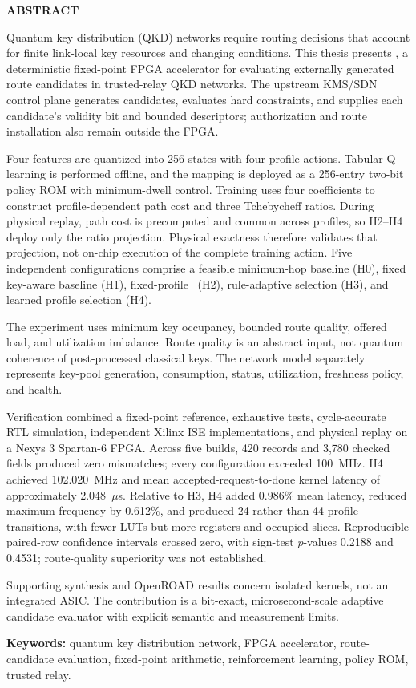 \begin{center}
  {\bfseries\fontsize{16pt}{19pt}\selectfont ABSTRACT}
\end{center}
\vspace{0.8cm}

\noindent
Quantum key distribution (QKD) networks require routing decisions that account for
finite link-local key resources and changing conditions. This thesis presents
\QFlow, a deterministic fixed-point FPGA accelerator for evaluating externally
generated route candidates in trusted-relay QKD networks. The upstream KMS/SDN
control plane generates candidates, evaluates hard constraints, and supplies each
candidate's validity bit and bounded descriptors; authorization and route
installation also remain outside the FPGA.

Four features are quantized into 256 states with four profile actions. Tabular
Q-learning is performed offline, and the mapping is deployed as a 256-entry two-bit
policy ROM with minimum-dwell control. Training uses four coefficients to construct
profile-dependent path cost and three Tchebycheff ratios. During physical replay,
path cost is precomputed and common across profiles, so H2--H4 deploy only the ratio
projection. Physical exactness therefore validates that projection, not on-chip
execution of the complete training action. Five independent configurations comprise
a feasible minimum-hop baseline (H0), fixed key-aware baseline (H1), fixed-profile
\QFlow\ (H2), rule-adaptive selection (H3), and learned profile selection (H4).

The experiment uses minimum key occupancy, bounded route quality, offered load, and
utilization imbalance. Route quality is an abstract input, not quantum coherence of
post-processed classical keys. The network model separately represents key-pool
generation, consumption, status, utilization, freshness policy, and health.

Verification combined a fixed-point reference, exhaustive tests, cycle-accurate RTL
simulation, independent Xilinx ISE implementations, and physical replay on a Nexys 3
Spartan-6 FPGA. Across five builds, 420 records and 3,780 checked fields produced zero
mismatches; every configuration exceeded 100~MHz. H4 achieved 102.020~MHz and mean
accepted-request-to-done kernel latency of approximately 2.048~$\mu$s. Relative to
H3, H4 added 0.986\% mean latency, reduced maximum frequency by 0.612\%, and produced
24 rather than 44 profile transitions, with fewer LUTs but more registers and
occupied slices. Reproducible paired-row confidence intervals crossed zero, with
sign-test $p$-values 0.2188 and 0.4531; route-quality superiority was not established.

Supporting synthesis and OpenROAD results concern isolated kernels, not an
integrated ASIC. The contribution is a bit-exact, microsecond-scale adaptive
candidate evaluator with explicit semantic and measurement limits.

\vspace{0.5cm}
\noindent\textbf{Keywords:} quantum key distribution network, FPGA accelerator,
route-candidate evaluation, fixed-point arithmetic, reinforcement learning,
policy ROM, trusted relay.
